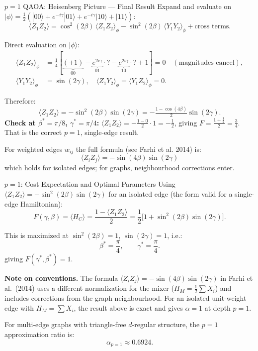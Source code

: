 \documentclass{beamer}
\begin{document}

\begin{frame}{$p=1$ QAOA: Heisenberg Picture — Final Result}
Expand and evaluate on $|\phi\rangle = \tfrac{1}{2}(|00\rangle
+ e^{-i\gamma}|01\rangle + e^{-i\gamma}|10\rangle + |11\rangle)$:
\[
\langle Z_1Z_2\rangle
= \cos^2(2\beta)\,\langle Z_1Z_2\rangle_\phi
- \sin^2(2\beta)\,\langle Y_1Y_2\rangle_\phi
+ \text{cross terms.}
\]

Direct evaluation on $|\phi\rangle$:
\begin{align*}
\langle Z_1Z_2\rangle_\phi &=
\tfrac{1}{4}[\underbrace{(+1)}_{00}-\underbrace{e^{2i\gamma}}_{01}\cdot?-\underbrace{e^{2i\gamma}}_{10}\cdot?+1]
= 0 \quad(\text{magnitudes cancel}),\\
\langle Y_1Y_2\rangle_\phi &= \sin(2\gamma),
\quad \langle Z_1Y_2\rangle_\phi = \langle Y_1Z_2\rangle_\phi = 0.
\end{align*}

Therefore:
\[
\langle Z_1Z_2\rangle = -\sin^2(2\beta)\sin(2\gamma)
= -\tfrac{1-\cos(4\beta)}{2}\sin(2\gamma).
\]
\textbf{Check at $\beta^*=\pi/8$, $\gamma^*=\pi/4$:}
$\langle Z_1Z_2\rangle = -\tfrac{1-0}{2}\cdot 1 = -\tfrac{1}{2}$, giving
$F = \tfrac{1+\frac{1}{2}}{2} = \tfrac{3}{4}$. That is the correct $p=1$, single-edge result.

\medskip
For weighted edges $w_{ij}$ the full formula (see Farhi et al. 2014) is:
\[
\boxed{\langle Z_iZ_j\rangle = -\sin(4\beta)\sin(2\gamma)}
\]
which holds for isolated edges; for graphs, neighbourhood corrections enter.
\end{frame}


\begin{frame}{$p=1$: Cost Expectation and Optimal Parameters}
Using $\langle Z_1Z_2\rangle = -\sin^2(2\beta)\sin(2\gamma)$
for an isolated edge (the form valid for a single-edge Hamiltonian):
\[
F(\gamma,\beta)
= \langle H_C\rangle
= \frac{1 - \langle Z_1Z_2\rangle}{2}
= \frac{1}{2}\bigl[1 + \sin^2(2\beta)\sin(2\gamma)\bigr].
\]

This is maximized at $\sin^2(2\beta)=1$, $\sin(2\gamma)=1$, i.e.:
\[
\beta^* = \frac{\pi}{4},\qquad \gamma^* = \frac{\pi}{4}.
\]
giving $F(\gamma^*,\beta^*) = 1$.

\medskip
\textbf{Note on conventions.}  The formula $\langle Z_iZ_j\rangle
= -\sin(4\beta)\sin(2\gamma)$ in Farhi et al.\ (2014) uses a different
normalization for the mixer ($H_M = \tfrac{1}{2}\sum X_i$) and
includes corrections from the graph neighbourhood.
For an isolated unit-weight edge with $H_M = \sum X_i$,
the result above is exact and gives $\alpha=1$ at depth $p=1$.

For multi-edge graphs with triangle-free $d$-regular structure,
the $p=1$ approximation ratio is:
\[
\alpha_{p=1} \approx 0.6924.
\]
\end{frame}
\end{document}
